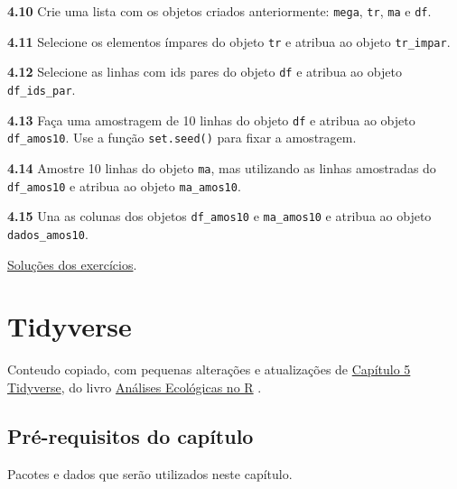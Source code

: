 \documentclass[
]{article}
\begin{document}
\textbf{4.10}
Crie uma lista com os objetos criados anteriormente: \texttt{mega}, \texttt{tr}, \texttt{ma} e \texttt{df}.

\textbf{4.11}
Selecione os elementos ímpares do objeto \texttt{tr} e atribua ao objeto \texttt{tr\_impar}.

\textbf{4.12}
Selecione as linhas com ids pares do objeto \texttt{df} e atribua ao objeto \texttt{df\_ids\_par}.

\textbf{4.13}
Faça uma amostragem de 10 linhas do objeto \texttt{df} e atribua ao objeto \texttt{df\_amos10}. Use a função \texttt{set.seed()} para fixar a amostragem.

\textbf{4.14}
Amostre 10 linhas do objeto \texttt{ma}, mas utilizando as linhas amostradas do \texttt{df\_amos10} e atribua ao objeto \texttt{ma\_amos10}.

\textbf{4.15}
Una as colunas dos objetos \texttt{df\_amos10} e \texttt{ma\_amos10} e atribua ao objeto \texttt{dados\_amos10}.

\href{https://exercicios-livro-aer.netlify.app/cap.-4---introdu\%C3\%A7\%C3\%A3o-ao-r.html}{Soluções dos exercícios}.

\newpage{}

\hypertarget{cap22}{%
\section{Tidyverse}\label{cap22}}

Conteudo copiado, com pequenas alterações e atualizações de \href{https://analises-ecologicas.com/cap5}{Capítulo 5 Tidyverse}, do livro \href{https://analises-ecologicas.com/}{Análises Ecológicas no R} .

\hypertarget{pruxe9-requisitos-do-capuxedtulo-1}{%
\subsection*{Pré-requisitos do capítulo}\label{pruxe9-requisitos-do-capuxedtulo-1}}

Pacotes e dados que serão utilizados neste capítulo.
\end{document}
